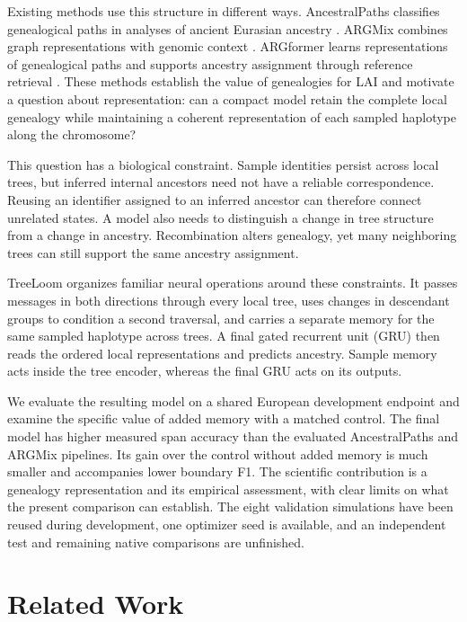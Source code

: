 \documentclass[letterpaper]{article}
\begin{document}
Existing methods use this structure in different ways. AncestralPaths classifies genealogical paths in analyses of ancient Eurasian ancestry \citep{eurasians2024}. ARGMix combines graph representations with genomic context \citep{ancientancestry2026}. ARGformer learns representations of genealogical paths and supports ancestry assignment through reference retrieval \citep{argformer2026}. These methods establish the value of genealogies for LAI and motivate a question about representation: can a compact model retain the complete local genealogy while maintaining a coherent representation of each sampled haplotype along the chromosome?

This question has a biological constraint. Sample identities persist across local trees, but inferred internal ancestors need not have a reliable correspondence. Reusing an identifier assigned to an inferred ancestor can therefore connect unrelated states. A model also needs to distinguish a change in tree structure from a change in ancestry. Recombination alters genealogy, yet many neighboring trees can still support the same ancestry assignment.

TreeLoom organizes familiar neural operations around these constraints. It passes messages in both directions through every local tree, uses changes in descendant groups to condition a second traversal, and carries a separate memory for the same sampled haplotype across trees. A final gated recurrent unit (GRU) then reads the ordered local representations and predicts ancestry. Sample memory acts inside the tree encoder, whereas the final GRU acts on its outputs.

We evaluate the resulting model on a shared European development endpoint and examine the specific value of added memory with a matched control. The final model has higher measured span accuracy than the evaluated AncestralPaths and ARGMix pipelines. Its gain over the control without added memory is much smaller and accompanies lower boundary F1. The scientific contribution is a genealogy representation and its empirical assessment, with clear limits on what the present comparison can establish. The eight validation simulations have been reused during development, one optimizer seed is available, and an independent test and remaining native comparisons are unfinished.

\section{Related Work}
\end{document}

